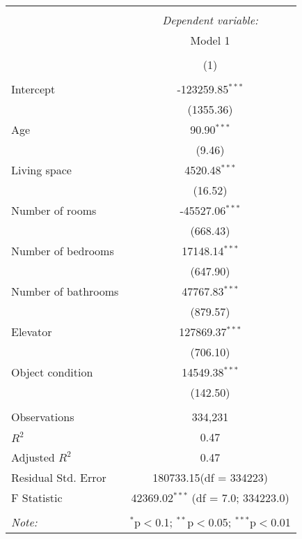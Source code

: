 \begin{table}[!htbp] \centering
\begin{tabular}{@{\extracolsep{5pt}}lc}
\\[-1.8ex]\hline
\hline \\[-1.8ex]
& \multicolumn{1}{c}{\textit{Dependent variable:}} \
\cr \cline{1-2}
\\[-1.8ex] & \multicolumn{1}{c}{Model 1} \\\\[-1.8ex] & (1) \\
\hline \\[-1.8ex]
 Intercept & -123259.85$^{***}$ \\
  & (1355.36) \\
 Age & 90.90$^{***}$ \\
  & (9.46) \\
 Living space & 4520.48$^{***}$ \\
  & (16.52) \\
 Number of rooms & -45527.06$^{***}$ \\
  & (668.43) \\
 Number of bedrooms & 17148.14$^{***}$ \\
  & (647.90) \\
 Number of bathrooms & 47767.83$^{***}$ \\
  & (879.57) \\
 Elevator & 127869.37$^{***}$ \\
  & (706.10) \\
 Object condition & 14549.38$^{***}$ \\
  & (142.50) \\
\hline \\[-1.8ex]
 Observations & 334,231 \\
 $R^2$ & 0.47 \\
 Adjusted $R^2$ & 0.47 \\
 Residual Std. Error & 180733.15(df = 334223)  \\
 F Statistic & 42369.02$^{***}$ (df = 7.0; 334223.0) \\
\hline
\hline \\[-1.8ex]
\textit{Note:} & \multicolumn{1}{r}{$^{*}$p$<$0.1; $^{**}$p$<$0.05; $^{***}$p$<$0.01} \\
\end{tabular}
\end{table}